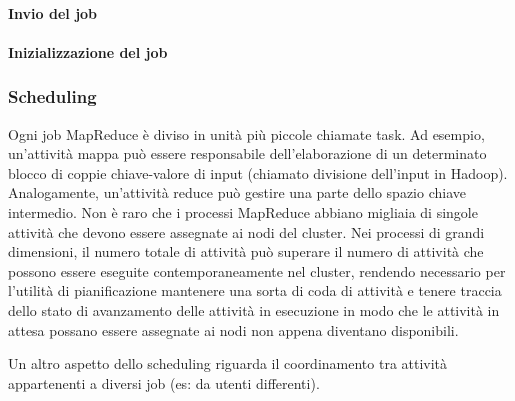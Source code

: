 \documentclass{article}
\begin{document}
\paragraph*{Invio del job}

\paragraph*{Inizializzazione del job} 


\subsubsection{Scheduling}
Ogni job MapReduce è diviso in unità più piccole chiamate task. Ad esempio, un'attività mappa può essere responsabile dell'elaborazione di un determinato blocco di coppie chiave-valore di input (chiamato divisione dell'input in Hadoop). Analogamente, un'attività reduce può gestire una parte dello spazio chiave intermedio. Non è raro che i processi MapReduce abbiano migliaia di singole attività che devono essere assegnate ai nodi del cluster. Nei processi di grandi dimensioni, il numero totale di attività può superare il numero di attività che possono essere eseguite contemporaneamente nel cluster, rendendo necessario per l'utilità di pianificazione mantenere una sorta di coda di attività e tenere traccia dello stato di avanzamento delle attività in esecuzione in modo che le attività in attesa possano essere assegnate ai nodi non appena diventano disponibili.

Un altro aspetto dello scheduling riguarda il coordinamento tra attività appartenenti a diversi job (es: da utenti differenti).
\end{document}
